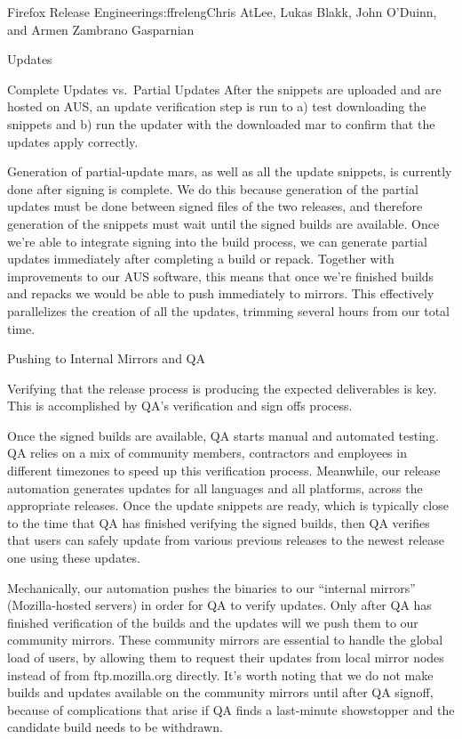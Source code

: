 \begin{aosachapter}{Firefox Release Engineering}{s:ffreleng}{Chris AtLee, Lukas Blakk, John O'Duinn, and Armen Zambrano Gasparnian}
\begin{aosasect1}{Updates}
\begin{aosasect2}{Complete Updates vs.\ Partial Updates}
After the snippets are
uploaded and are hosted on AUS, an update verification step is run to
a) test downloading the snippets and b) run the updater with the
downloaded mar to confirm that the updates apply correctly.

Generation of partial-update mars, as well as all the update snippets,
is currently done after signing is complete. We do this because
generation of the partial updates must be done between signed files of
the two releases, and therefore generation of the snippets must wait
until the signed builds are available.  Once we're able to integrate
signing into the build process, we can generate partial updates
immediately after completing a build or repack. Together with
improvements to our AUS software, this means that once we're finished
builds and repacks we would be able to push immediately to
mirrors. This effectively parallelizes the creation of all the
updates, trimming several hours from our total time.
  
\end{aosasect2}

\end{aosasect1}

\begin{aosasect1}{Pushing to Internal Mirrors and QA}

Verifying that the release process is producing the expected
deliverables is key. This
is accomplished by QA's verification and sign offs process.

Once the signed builds are available, QA starts manual and automated
testing. QA relies on a mix of community members,
contractors and employees in different timezones to speed up this
verification process. Meanwhile, our release automation generates
updates for all languages and all platforms, across the appropriate
releases. Once the update snippets are ready, which is typically close
to the time that QA has finished verifying the signed builds, then QA
verifies that users can safely update from various previous releases
to the newest release one using these updates.

Mechanically, our automation pushes the binaries to our ``internal
mirrors'' (Mozilla-hosted servers) in order for QA to verify
updates. Only after QA has finished verification of the builds and
the updates will we push them to our
community mirrors. These community mirrors are essential to
handle the global load of users, by allowing them to request their updates
from local mirror nodes instead of from ftp.mozilla.org
directly. It's worth noting that we do not make builds and updates
available on the community mirrors until after QA signoff, because of
complications that arise if QA finds a last-minute showstopper
and the candidate build needs to be withdrawn.


\end{aosasect1}
\end{aosachapter}
